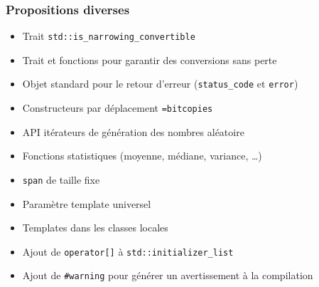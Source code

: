 \documentclass[C++.tex]{subfiles}
\begin{document}
\begin{frame}[fragile]
	\frametitle{Propositions diverses}
	\begin{itemize}
		\item Trait \lstinline|std::is_narrowing_convertible|
		\item Trait et fonctions pour garantir des conversions sans perte
		\item Objet standard pour le retour d'erreur (\lstinline|status_code| et \lstinline|error|)
		\item Constructeurs par déplacement \lstinline|=bitcopies|
		\item API \og itérateurs\fg{} de génération des nombres aléatoire
		\item Fonctions statistiques (moyenne, médiane, variance, \ldots)
		\item \lstinline|span| de taille fixe
		\item Paramètre template universel


		\item Templates dans les classes locales
		\item Ajout de \lstinline|operator[]| à \lstinline|std::initializer_list|
		\item Ajout de \lstinline|#warning| pour générer un avertissement à la compilation


	\end{itemize}
\end{frame}
\end{document}
